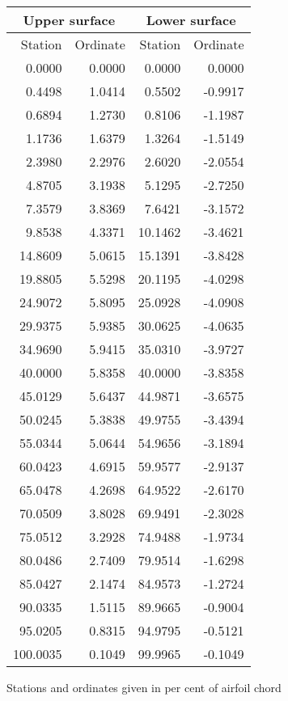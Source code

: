 \documentclass[11pt]{book}
\begin{document}
 \hspace{4mm}
 \begin{tabular}{|r|r|r|r|} \hline 
 \multicolumn{2}{|c|}{Upper surface} & \multicolumn{2}{|c|}{Lower surface} \\
 \hline
 Station & Ordinate & Station & Ordinate \\
 \hline
0.0000 & 0.0000 & 0.0000 & 0.0000 \\
0.4498 & 1.0414 & 0.5502 & -0.9917 \\
0.6894 & 1.2730 & 0.8106 & -1.1987 \\
1.1736 & 1.6379 & 1.3264 & -1.5149 \\
2.3980 & 2.2976 & 2.6020 & -2.0554 \\
4.8705 & 3.1938 & 5.1295 & -2.7250 \\
7.3579 & 3.8369 & 7.6421 & -3.1572 \\
9.8538 & 4.3371 & 10.1462 & -3.4621 \\
14.8609 & 5.0615 & 15.1391 & -3.8428 \\
19.8805 & 5.5298 & 20.1195 & -4.0298 \\
24.9072 & 5.8095 & 25.0928 & -4.0908 \\
29.9375 & 5.9385 & 30.0625 & -4.0635 \\
34.9690 & 5.9415 & 35.0310 & -3.9727 \\
40.0000 & 5.8358 & 40.0000 & -3.8358 \\
45.0129 & 5.6437 & 44.9871 & -3.6575 \\
50.0245 & 5.3838 & 49.9755 & -3.4394 \\
55.0344 & 5.0644 & 54.9656 & -3.1894 \\
60.0423 & 4.6915 & 59.9577 & -2.9137 \\
65.0478 & 4.2698 & 64.9522 & -2.6170 \\
70.0509 & 3.8028 & 69.9491 & -2.3028 \\
75.0512 & 3.2928 & 74.9488 & -1.9734 \\
80.0486 & 2.7409 & 79.9514 & -1.6298 \\
85.0427 & 2.1474 & 84.9573 & -1.2724 \\
90.0335 & 1.5115 & 89.9665 & -0.9004 \\
95.0205 & 0.8315 & 94.9795 & -0.5121 \\
100.0035 & 0.1049 & 99.9965 & -0.1049 \\
 \hline 
 \end{tabular}
 \vspace{8mm}

Stations and ordinates given in per cent of airfoil chord
\end{document}
